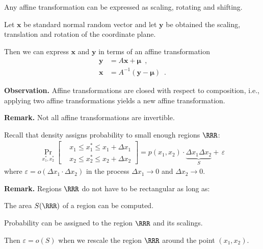 \documentclass[landscape,footrule]{foils}
\renewcommand{\vec}[1]{\boldsymbol{#1}}
\newcommand{\lastline}{\vspace*{-2ex}}
\begin{document}
Any affine transformation can be expressed as scaling, rotating and shifting.





Let $\vec{x}$ be standard normal random vector and let $\vec{y}$ be obtained the scaling,  translation and rotation of the coordinate plane.

Then we can express $\vec{x}$ and $\vec{y}$ in terms of an affine transformation
\begin{align*}
  \vec{y}&=A\vec{x}+\vec{\mu} \enspace,\\
  \vec{x}&=A^{-1}(\vec{y}-\vec{\mu}) \enspace.
\end{align*}

\textbf{Observation.}
Affine transformations are closed with respect to composition, i.e., applying two affine transformations yields a new affine transformation. \vspace*{2ex}

\textbf{Remark.} Not all affine transformations are invertible.\lastline




Recall that density assigns probability to small enough regions $\RRR$:
\begin{align*}
\Pr_{x_1^*,x_2^*}
\left[\begin{aligned}
   &x_1\leq x_1^*\leq x_1+\Delta x_1\\ 
   &x_2\leq x_2^*\leq x_2+\Delta x_2
\end{aligned}\right]= p(x_1,x_2)\cdot\underbrace{\Delta x_1\Delta x_2}_S +\, \varepsilon
\end{align*}
where $\varepsilon=o(\Delta x_1\cdot\Delta x_2)$ in the process $\Delta x_1\to 0$ and $\Delta x_2\to 0$.\vspace*{1cm}

\textbf{Remark.} Regions $\RRR$ do not have to be rectangular as long as:
\begin{triangles}
\item The area $S(\RRR)$ of a region can be computed.  
\item Probability can be assigned to the region $\RRR$ and its scalings.
\end{triangles}
Then $\varepsilon=o(S)$ when we rescale the region $\RRR$ around the point $(x_1,x_2)$.


\end{document}
